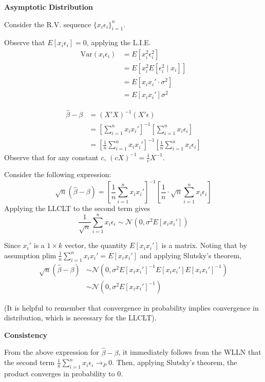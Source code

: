 \documentclass[16pt]{article}
\newcommand{\bh}{\hat{\beta}}
\newcommand{\norm}{\mathcal{N}}
\newcommand{\plim}{\text{plim}\; }
\newcommand{\Var}{\text{Var}}
\begin{document}
\textbf{Asymptotic Distribution}

Consider the R.V. sequence $\{x_i \epsilon_i\}_{i=1}^n$.

Observe that $E[x_i \epsilon_i] = 0$, applying the L.I.E.
\begin{align*}
  \Var(x_i \epsilon_i) &= E[x_i^2 \epsilon_i^2]\\
      &= E[x_i^2 E[\epsilon_i^2 \mid x_i]]\\
      &= E[x_i x_i' \cdot \sigma^2]\\
      &= E[x_i x_i'] \sigma^2
\end{align*}

\begin{align*}
\bh - \beta &= (X'X)^{-1}(X'\epsilon)\\
  &= [\sum_{i=1}^n x_i x_i']^{-1}[\sum_{i=1}^n x_i\epsilon_i]\\
  &= [\frac{1}{n} \sum_{i=1}^n x_i x_i']^{-1}[\frac{1}{n}\sum_{i=1}^n x_i\epsilon_i]
\end{align*}
Observe that for any constant $c$, $(cX)^{-1} = \frac{1}{c}X^{-1}$.

Consider the following expression:
$$\sqrt{n}(\bh - \beta) = [\frac{1}{n} \sum_{i=1}^n x_i x_i']^{-1}[\frac{1}{n} \cdot \sqrt{n} \sum_{i=1}^n x_i\epsilon_i]$$
Applying the LLCLT to the second term gives 
$$\frac{1}{\sqrt{n}} \sum_{i=1}^n x_i \epsilon_i \sim \norm(0, \sigma^2 E[x_i x_i'])$$

Since $x_i'$ is a $1 \times k$ vector, the quantity $E[x_i x_i']$ is a matrix. Noting that by assumption $\plim \frac{1}{n} \sum_{i=1}^n x_i x_i' = E[x_i x_i']$ and applying Slutsky's theorem, 
\begin{align*}
  \sqrt{n}(\bh - \beta) &\sim \norm(0, \sigma^2 E[x_i x_i']^{-1} E[x_i x_i'] E[x_i x_i']^{-1})\\
  &\sim \norm(0, \sigma^2 E[x_i x_i']^{-1})
\end{align*}

(It is helpful to remember that convergence in probability implies convergence in distribution, which is necessary for the LLCLT).

\textbf{Consistency}

From the above expression for $\bh - \beta$, it immediately follows from the WLLN that the second term $\frac{1}{n} \sum_{i=1}^n x_i \epsilon_i \to_P 0$. Then, applying Slutsky's theorem, the product converges in probability to $0$.
\end{document}
